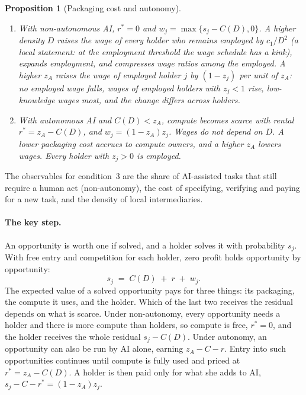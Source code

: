 \documentclass[12pt]{article}
\newtheorem{proposition}{Proposition}
\theoremstyle{remark}
\begin{document}
\begin{proposition}[Packaging cost and autonomy]\label{prop:autonomy}
\begin{enumerate}[label=(\roman*),itemsep=0pt]
\item With non-autonomous AI, $r^*=0$ and $w_j=\max\{s_j-C(D),0\}$. A higher density $D$ raises the wage of every holder who remains employed by $c_1/D^2$ (a local statement: at the employment threshold the wage schedule has a kink), expands employment, and compresses wage ratios among the employed. A higher $z_A$ raises the wage of employed holder $j$ by $(1-z_j)$ per unit of $z_A$: no employed wage falls, wages of employed holders with $z_j<1$ rise, low-knowledge wages most, and the change differs across holders.
\item With autonomous AI and $C(D)<z_A$, compute becomes scarce with rental $r^*=z_A-C(D)$, and $w_j=(1-z_A)z_j$. Wages do not depend on $D$. A lower packaging cost accrues to compute owners, and a higher $z_A$ lowers wages. Every holder with $z_j>0$ is employed.
\end{enumerate}
\end{proposition}

The observables for condition~3 are the share of AI-assisted tasks that still require a human act (non-autonomy), the cost of specifying, verifying and paying for a new task, and the density of local intermediaries.

\paragraph{The key step.} An opportunity is worth one if solved, and a holder solves it with probability $s_j$. With free entry and competition for each holder, zero profit holds opportunity by opportunity:
\[
s_j\;=\;C(D)\;+\;r\;+\;w_j .
\]
The expected value of a solved opportunity pays for three things: its packaging, the compute it uses, and the holder. Which of the last two receives the residual depends on what is scarce. Under non-autonomy, every opportunity needs a holder and there is more compute than holders, so compute is free, $r^*=0$, and the holder receives the whole residual $s_j-C(D)$. Under autonomy, an opportunity can also be run by AI alone, earning $z_A-C-r$. Entry into such opportunities continues until compute is fully used and priced at $r^*=z_A-C(D)$. A holder is then paid only for what she adds to AI, $s_j-C-r^*=(1-z_A)z_j$.
\end{document}
